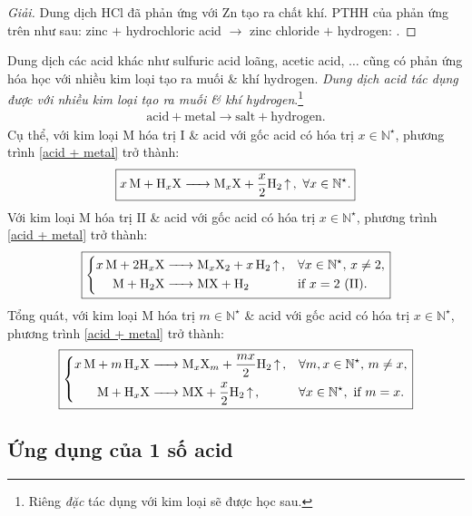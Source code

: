 \documentclass{article}
\begin{document}
\begin{proof}[Giải]
	Dung dịch HCl đã phản ứng với Zn tạo ra chất khí. PTHH của phản ứng trên như sau: zinc $+$ hydrochloric acid $\to$ zinc chloride $+$ hydrogen: .
\end{proof}
Dung dịch các acid khác như sulfuric acid loãng, acetic acid, $\ldots$ cũng có phản ứng hóa học với nhiều kim loại tạo ra muối \& khí hydrogen. \textit{Dung dịch acid tác dụng được với nhiều kim loại tạo ra muối \& khí hydrogen}.\footnote{Riêng  \textit{đặc} tác dụng với kim loại sẽ được học sau.}
\begin{align}
	\label{acid + metal}
	\boxed{\mbox{acid} + \mbox{metal}\to\mbox{salt} + \mbox{hydrogen}.}
\end{align}
Cụ thể, với kim loại M hóa trị I \& acid  với gốc acid  có hóa trị $x\in\mathbb{N}^\star$, phương trình \eqref{acid + metal} trở thành:
\begin{align}
	\boxed{\ce{$x$M + H_xX -> M_xX + $\frac{x}{2}$H2 ^},\ \forall x\in\mathbb{N}^\star.}
\end{align}
Với kim loại M hóa trị II \& acid  với gốc acid  có hóa trị $x\in\mathbb{N}^\star$, phương trình \eqref{acid + metal} trở thành:
\begin{equation}
	\boxed{\left\{\begin{split}
			\ce{$x$M + $2$H_xX &-> M_xX2 + $x$H2 ^},&&\forall x\in\mathbb{N}^\star,\,x\ne2,\\
			\ce{M + H2X &-> MX + H2}&&\mbox{if } x = 2\ (\mbox{II}).
		\end{split}\right.}
\end{equation}
Tổng quát, với kim loại M hóa trị $m\in\mathbb{N}^\star$ \& acid  với gốc acid  có hóa trị $x\in\mathbb{N}^\star$, phương trình \eqref{acid + metal} trở thành:
\begin{equation}
	\boxed{\left\{\begin{split}
			\ce{$x$M + $m$H_xX &-> M_xX_m + $\frac{mx}{2}$H2 ^},&&\forall m,x\in\mathbb{N}^\star,\,m\ne x,\\
			\ce{M + H_xX &-> MX + $\frac{x}{2}$H2 ^},&&\forall x\in\mathbb{N}^\star,\mbox{ if } m = x.
		\end{split}\right.}
\end{equation}

\subsection{Ứng dụng của 1 số acid}
\end{document}
